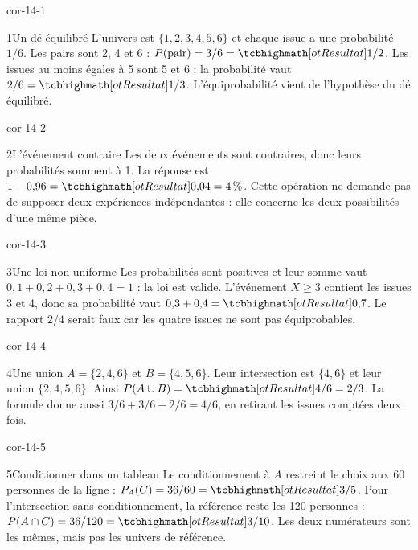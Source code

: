 \clearpage\pagestyle{otMain}\fontsize{11}{15}\selectfont
{}
\begin{blocLivre}{cor-14-1}
\begin{corrige}{1}{Un dé équilibré}
L’univers est $\{1,2,3,4,5,6\}$ et chaque issue a une probabilité $1/6$. Les pairs sont 2, 4 et 6 : $P(\text{pair})=3/6=\res{1/2}$. Les issues au moins égales à 5 sont 5 et 6 : la probabilité vaut $2/6=\res{1/3}$. L’équiprobabilité vient de l’hypothèse du dé équilibré.
\end{corrige}
\end{blocLivre}
\begin{blocLivre}{cor-14-2}
\begin{corrige}{2}{L’événement contraire}
Les deux événements sont contraires, donc leurs probabilités somment à 1. La réponse est $1-0{,}96=\res{0{,}04=4\,\%}$. Cette opération ne demande pas de supposer deux expériences indépendantes : elle concerne les deux possibilités d’une même pièce.
\end{corrige}
\end{blocLivre}
\begin{blocLivre}{cor-14-3}
\begin{corrige}{3}{Une loi non uniforme}
Les probabilités sont positives et leur somme vaut $0{,}1+0{,}2+0{,}3+0{,}4=1$ : la loi est valide. L’événement $X\ge3$ contient les issues 3 et 4, donc sa probabilité vaut $0{,}3+0{,}4=\res{0{,}7}$. Le rapport $2/4$ serait faux car les quatre issues ne sont pas équiprobables.
\end{corrige}
\end{blocLivre}
\begin{blocLivre}{cor-14-4}
\begin{corrige}{4}{Une union}
$A=\{2,4,6\}$ et $B=\{4,5,6\}$. Leur intersection est $\{4,6\}$ et leur union $\{2,4,5,6\}$. Ainsi $P(A\cup B)=\res{4/6=2/3}$. La formule donne aussi $3/6+3/6-2/6=4/6$, en retirant les issues comptées deux fois.
\end{corrige}
\end{blocLivre}
\begin{blocLivre}{cor-14-5}
\begin{corrige}{5}{Conditionner dans un tableau}
Le conditionnement à $A$ restreint le choix aux 60 personnes de la ligne : $P_A(C)=36/60=\res{3/5}$. Pour l’intersection sans conditionnement, la référence reste les 120 personnes : $P(A\cap C)=36/120=\res{3/10}$. Les deux numérateurs sont les mêmes, mais pas les univers de référence.
\end{corrige}
\end{blocLivre}

